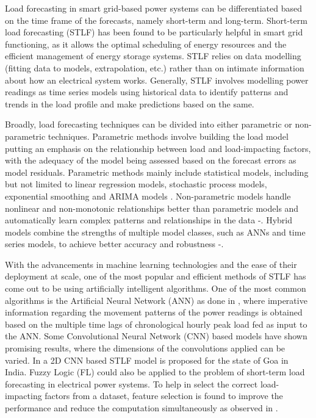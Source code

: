 \documentclass[conference]{IEEEtran}
\begin{document}
Load forecasting in smart grid-based power systems can be differentiated based on the time frame of the forecasts, namely short-term and long-term. Short-term load forecasting (STLF) has been found to be particularly helpful in smart grid functioning, as it allows the optimal scheduling of energy resources and the efficient management of energy storage systems. STLF relies on data modelling (fitting data to models, extrapolation, etc.) rather than on intimate information about how an electrical system works. Generally, STLF involves modelling power readings as time series models using historical data to identify patterns and trends in the load profile and make predictions based on the same.  

Broadly, load forecasting techniques can be divided into either parametric or non-parametric techniques. Parametric methods  involve building the load model putting an emphasis on the relationship between load and load-impacting factors, with the adequacy of the model being assessed based on the forecast errors as model residuals. Parametric methods mainly include statistical models, including but not limited to linear regression models, stochastic process models, exponential smoothing and ARIMA models \cite{regr1}. Non-parametric models handle nonlinear and non-monotonic relationships better than parametric models and automatically learn complex patterns and relationships in the data \cite{np1}-\cite{np2}. Hybrid models combine the strengths of multiple model classes, such as ANNs and time series models, to achieve better accuracy and robustness \cite{h1}-\cite{h2}.

With the advancements in machine learning technologies and the ease of their deployment at scale, one of the most popular and efficient methods of STLF has come out to be using artificially intelligent algorithms. One of the most common algorithms is the Artificial Neural Network (ANN) as done in \cite{generalnn3}, where imperative information regarding the movement patterns of the power readings is obtained based on the multiple time lags of chronological hourly peak load fed as input to the ANN. Some Convolutional Neural Network (CNN) based models have shown promising results, where the dimensions of the convolutions applied can be varied. In \cite{generalnn2} a 2D CNN based STLF model is proposed for the state of Goa in India. Fuzzy Logic (FL) could also be applied to the problem of short-term load forecasting in electrical power systems. To help in select the correct load-impacting factors from a dataset, feature selection is found to improve the performance and reduce the computation simultaneously as observed in \cite{fuzzy}. 
\end{document}
